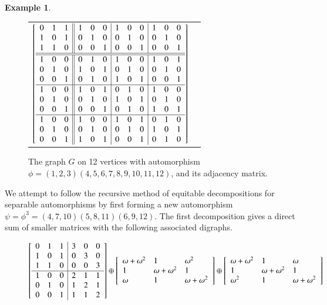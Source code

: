 \documentclass[preprint,12pt]{elsarticle}
\newcommand{\w}{\omega}
\theoremstyle{definition}
\newtheorem{example}[thm]{Example}
\theoremstyle{remark}
\begin{document}
\begin{example}
\begin{figure}[h]
\begin{tabular}{cc}
\begin{minipage}[b]{.47\textwidth}
 $\left[\begin{array}{lll || lll | lll | lll}
0 & 1 & 1 & 1 & 0 & 0 & 1 & 0 &  0 & 1 & 0 & 0\\
1 & 0 & 1 & 0 & 1 & 0 & 0 & 1 & 0 &  0 &  1 &  0\\
1 & 1 & 0 & 0 & 0 & 1 & 0 & 0 & 1 & 0 & 0 & 1\\\hline \hline 
1 & 0 & 0 & 0 & 1 & 0 & 1 & 0 & 0 & 1 & 0 & 1\\
0 & 1 & 0 & 1 & 0 & 1 & 0 & 1 & 0 & 0 & 1 &0\\
0 & 0 & 1 & 0 & 1 & 0 & 1 & 0 & 1 & 0 & 0 & 1\\\hline
1 & 0 & 0 & 1 &0 & 1 & 0 & 1 & 0 & 1 & 0 & 0\\
0 & 1 & 0 & 0 & 1 & 0 & 1 & 0 & 1 & 0 & 1 & 0\\
0 & 0 & 1 & 0 & 0 & 1 & 0 & 1 & 0 & 1 & 0 & 1\\\hline
1 & 0 & 0 & 1 & 0 & 0 & 1 & 0 & 1 & 0 & 1 & 0\\
0 & 1 & 0 & 0 & 1 & 0 & 0 & 1 & 0 & 1 & 0 & 1\\
0 & 0 & 1 & 1 & 0 & 1 & 0 & 0 & 1 & 0 & 1 & 0
\end{array}\right]$
\vspace{.5cm}

\end{minipage}
\end{tabular}
\caption{The graph $G$ on 12 vertices with automorphism $\phi=(1,2,3)(4,5,6,7,8,9,10,11,12)$, and its adjacency matrix.}
\end{figure}

We attempt to follow the recursive method of equitable decompositions for separable automorphisms \cite{FSSW} by first forming a new automorphism $\psi=\phi^3=(4,7,10)(5,8,11)(6,9,12)$. The first decomposition gives a direct sum of smaller matrices with the following associated digraphs.

\begin{figure}[h!]
\begin{center}
$\left[\begin{array}{lll | lll }
0 & 1 & 1 & 3 & 0 & 0 \\
1 & 0 & 1 & 0 & 3 & 0\\
1 & 1 & 0 & 0 & 0 & 3 \\\hline 
1 & 0 & 0 & 2 & 1 & 1 \\
0 & 1 & 0 & 1 & 2 & 1 \\
0 & 0 & 1 & 1 & 1 & 2 
\end{array}\right] \oplus 
\left[\begin{array}{lll }
\w +\w^2& 1 & \w^2  \\
1 & \w + \w^2 & 1 \\
\w & 1 & \w + \w^2  \\
\end{array}\right]\oplus 
\left[\begin{array}{lll }
\w +\w^2& 1 & \w  \\
1 & \w + \w^2 & 1 \\
\w^2 & 1 & \w + \w^2  \\
\end{array}\right]$ \\[2mm]



\end{center}
\end{figure}
\end{example}
\end{document}
